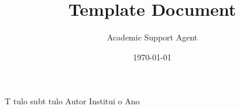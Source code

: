 \documentclass{article}
\title{Template Document}
\author{Academic Support Agent}
\date{\today}
\begin{document}
\maketitle

\tituloum
{T tulo}
{subt tulo}
{Autor}
{Institui o}
{Ano}



\thispagestyle{empty}


\newpage

\end{document}
